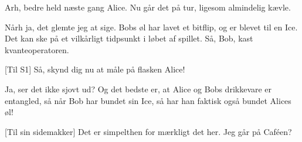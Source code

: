 \documentclass[a4paper,11pt]{article}
\begin{document}
\begin{sketch}
 Arh, bedre held næste gang Alice. Nu går det på tur, ligesom almindelig kævle. 


 Nårh ja, det glemte jeg at sige. Bobs øl har lavet et bitflip, og er blevet til en Ice. Det kan ske på et vilkårligt tidpsunkt i løbet af spillet. Så, Bob, kast kvanteoperatoren. 


[Til S1] Så, skynd dig nu at måle på flasken Alice! 


 Ja, ser det ikke sjovt ud? Og det bedste er, at Alice og Bobs drikkevare er entangled, så når Bob har bundet sin Ice, så har han faktisk også bundet Alices øl! 


[Til sin sidemakker] Det er simpelthen for mærkligt det her. Jeg går på Caféen?

\end{sketch}
\end{document}
